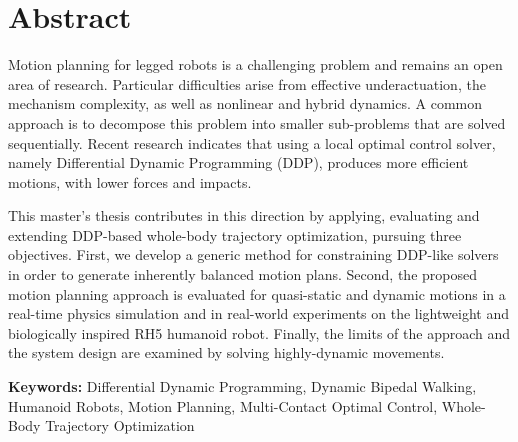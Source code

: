 \thispagestyle{empty}
\chapter*{Abstract}

Motion planning for legged robots is a challenging problem and remains an open area of research. Particular difficulties arise from effective underactuation, the mechanism complexity, as well as nonlinear and hybrid dynamics.
A common approach is to decompose this problem into smaller sub-problems that are solved sequentially. Recent research indicates that using a local optimal control solver, namely Differential Dynamic Programming (DDP), produces more efficient motions, with lower forces and impacts.

This master's thesis contributes in this direction by applying, evaluating and extending DDP-based whole-body trajectory optimization, pursuing three objectives. 
First, we develop a generic method for constraining DDP-like solvers in order to generate inherently balanced motion plans. 
Second, the proposed motion planning approach is evaluated for quasi-static and dynamic motions in a real-time physics simulation and in real-world experiments on the lightweight and biologically inspired RH5 humanoid robot.
Finally, the limits of the approach and the system design are examined by solving highly-dynamic movements. 

\vfill
\noindent\textbf{Keywords:} Differential Dynamic Programming, Dynamic Bipedal Walking, Humanoid Robots, Motion Planning, Multi-Contact Optimal Control, Whole-Body Trajectory Optimization
 












